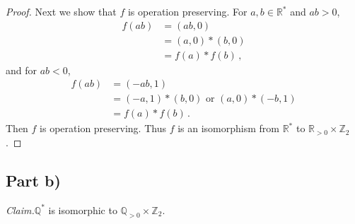 \documentclass{abrice}
\newcommand{\Z}{\mathbb{Z}}
\newcommand{\R}{\mathbb{R}}
\newcommand{\Q}{\mathbb{Q}}
\newcommand{\Claim}{\noindent\emph{Claim.}\xspace}%
\begin{document}
\begin{proof}
  Next we show that $f$ is operation preserving. For $a, b \in \R^*$ and $ab >
  0$,
  \begin{align*}
    f(ab)
    &= (ab, 0) \\
    &= (a, 0) * (b, 0) \\
    &= f(a) * f(b)\, ,
  \end{align*}
  and for $ab < 0$,
  \begin{align*}
    f(ab)
    &= (-ab, 1) \\
    &= (-a, 1) * (b, 0) \text{ or } (a,0) * (-b, 1) \\
    &= f(a) * f(b)\, .
  \end{align*}
  Then $f$ is operation preserving. Thus $f$ is an isomorphism from $\R^*$ to
  $\R_{>0} \times \Z_2$.
\end{proof}

\subsection{Part b)}

\Claim $\Q^*$ is isomorphic to $\Q_{>0} \times \Z_2$.
\end{document}
